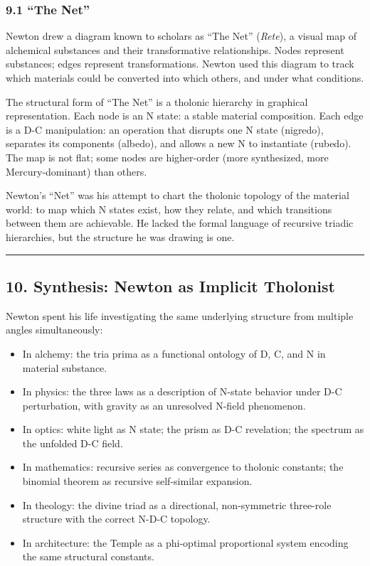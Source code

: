 \documentclass[
  11pt,
  letterpaper,
]{article}
\providecommand{\tightlist}{%
  \setlength{\itemsep}{0pt}\setlength{\parskip}{0pt}}
\begin{document}
\subsubsection{9.1 ``The Net''}\label{the-net}

Newton drew a diagram known to scholars as ``The Net'' (\emph{Rete}), a
visual map of alchemical substances and their transformative
relationships. Nodes represent substances; edges represent
transformations. Newton used this diagram to track which materials could
be converted into which others, and under what conditions.

The structural form of ``The Net'' is a tholonic hierarchy in graphical
representation. Each node is an N state: a stable material composition.
Each edge is a D-C manipulation: an operation that disrupts one N state
(nigredo), separates its components (albedo), and allows a new N to
instantiate (rubedo). The map is not flat; some nodes are higher-order
(more synthesized, more Mercury-dominant) than others.

Newton's ``Net'' was his attempt to chart the tholonic topology of the
material world: to map which N states exist, how they relate, and which
transitions between them are achievable. He lacked the formal language
of recursive triadic hierarchies, but the structure he was drawing is
one.

\begin{center}\rule{0.5\linewidth}{0.5pt}\end{center}

\subsection{10. Synthesis: Newton as Implicit
Tholonist}\label{synthesis-newton-as-implicit-tholonist}

Newton spent his life investigating the same underlying structure from
multiple angles simultaneously:

\begin{itemize}
\tightlist
\item
  In alchemy: the tria prima as a functional ontology of D, C, and N in
  material substance.
\item
  In physics: the three laws as a description of N-state behavior under
  D-C perturbation, with gravity as an unresolved N-field phenomenon.
\item
  In optics: white light as N state; the prism as D-C revelation; the
  spectrum as the unfolded D-C field.
\item
  In mathematics: recursive series as convergence to tholonic constants;
  the binomial theorem as recursive self-similar expansion.
\item
  In theology: the divine triad as a directional, non-symmetric
  three-role structure with the correct N-D-C topology.
\item
  In architecture: the Temple as a phi-optimal proportional system
  encoding the same structural constants.
\end{itemize}
\end{document}
